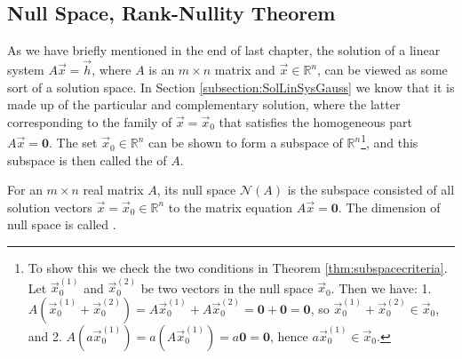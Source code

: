 \subsection{Null Space, Rank-Nullity Theorem}

As we have briefly mentioned in the end of last chapter, the solution of a linear system $A\vec{x} = \vec{h}$, where $A$ is an $m \times n$ matrix and $\vec{x} \in \mathbb{R}^n$, can be viewed as some sort of a solution space. In Section \ref{subsection:SolLinSysGauss} we know that it is made up of the particular and complementary solution, where the latter corresponding to the family of $\vec{x} = \vec{x}_0$ that satisfies the homogeneous part $A\vec{x} = \textbf{0}$. The set $\vec{x}_0 \in \mathbb{R}^n$ can be shown to form a subspace of $\mathbb{R}^n$\footnote{To show this we check the two conditions in Theorem \ref{thm:subspacecriteria}. Let $\vec{x}_0^{(1)}$ and $\vec{x}_0^{(2)}$ be two vectors in the null space $\vec{x}_0$. Then we have: 1. $A(\vec{x}_0^{(1)} + \vec{x}_0^{(2)}) = A\vec{x}_0^{(1)} + A\vec{x}_0^{(2)} = \textbf{0} + \textbf{0} = \textbf{0}$, so $\vec{x}_0^{(1)} + \vec{x}_0^{(2)} \in \vec{x}_0$, and 2. $A(a\vec{x}_0^{(1)}) = a(A\vec{x}_0^{(1)}) = a\textbf{0} = \textbf{0}$, hence $a\vec{x}_0^{(1)} \in \vec{x}_0$.}, and this subspace is then called the  of $A$.
\begin{defn}
\label{defn:nullspace}
For an $m \times n$ real matrix $A$, its null space $\mathcal{N}(A)$ is the subspace consisted of all solution vectors $\vec{x} = \vec{x}_0 \in \mathbb{R}^n$ to the matrix equation $A\vec{x} = \textbf{0}$. The dimension of null space is called .
\end{defn}


